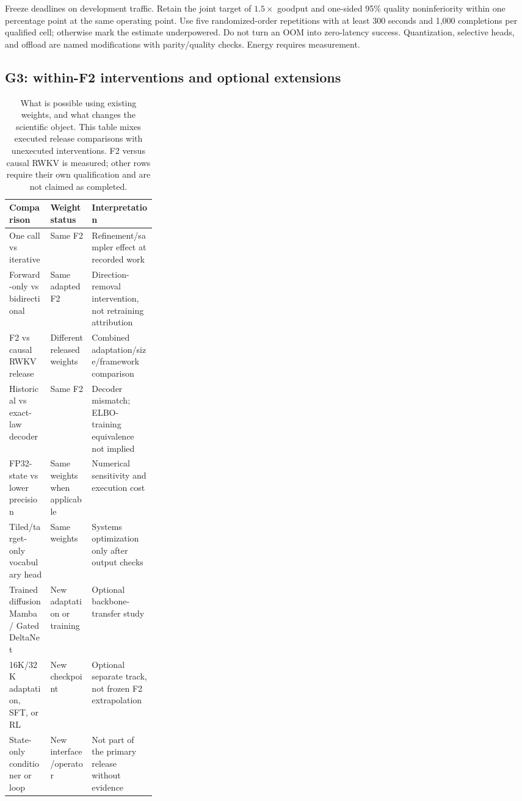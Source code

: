 \documentclass{article}
\theoremstyle{remark}\newtheorem{remark}[theorem]{Remark}
\begin{document}
Freeze deadlines on development traffic. Retain the joint target of $1.5\times$ goodput and one-sided 95\% quality noninferiority within one percentage point at the same operating point. Use five randomized-order repetitions with at least 300 seconds and 1,000 completions per qualified cell; otherwise mark the estimate underpowered. Do not turn an OOM into zero-latency success. Quantization, selective heads, and offload are named modifications with parity/quality checks. Energy requires measurement.

\subsection{G3: within-F2 interventions and optional extensions}
\begin{table}[ht]
\centering\small
\caption{What is possible using existing weights, and what changes the scientific object. This table mixes executed release comparisons with unexecuted interventions. F2 versus causal RWKV is measured; other rows require their own qualification and are not claimed as completed.}
\begin{tabularx}{\linewidth}{@{}p{0.28\linewidth}YY@{}}
\toprule
Comparison & Weight status & Interpretation\\
\midrule
One call vs iterative & Same F2 & Refinement/sampler effect at recorded work\\
Forward-only vs bidirectional & Same adapted F2 & Direction-removal intervention, not retraining attribution\\
F2 vs causal RWKV release & Different released weights & Combined adaptation/size/framework comparison\\
Historical vs exact-law decoder & Same F2 & Decoder mismatch; ELBO-training equivalence not implied\\
FP32-state vs lower precision & Same weights when applicable & Numerical sensitivity and execution cost\\
Tiled/target-only vocabulary head & Same weights & Systems optimization only after output checks\\
Trained diffusion Mamba / Gated DeltaNet & New adaptation or training & Optional backbone-transfer study\\
16K/32K adaptation, SFT, or RL & New checkpoint & Optional separate track, not frozen F2 extrapolation\\
State-only conditioner or loop & New interface/operator & Not part of the primary release without evidence\\
\bottomrule
\end{tabularx}
\end{table}
\end{document}
